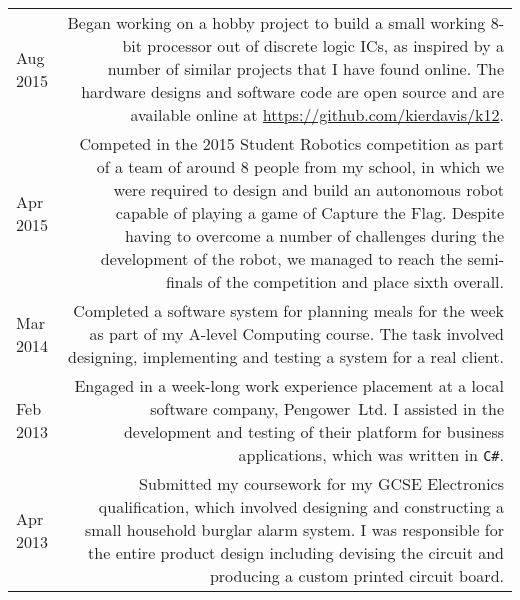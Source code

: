 
\vspace{-1.2em}

\begin{longtable}{L!{\sep}R}
    Aug 2015 &
    Began working on a hobby project to build a small working 8-bit processor out of discrete logic ICs, as inspired by a number of similar projects that I have found online. The hardware designs and software code are open source and are available online at \url{https://github.com/kierdavis/k12}.
    \vspace{1.2em} \\

    Apr 2015 &
    Competed in the 2015 Student Robotics competition as part of a team of around 8 people from my school, in which we were required to design and build an autonomous robot capable of playing a game of Capture the Flag. Despite having to overcome a number of challenges during the development of the robot, we managed to reach the semi-finals of the competition and place sixth overall.
    \vspace{1.2em} \\

    Mar 2014 &
    Completed a software system for planning meals for the week as part of my A-level Computing course. The task involved designing, implementing and testing a system for a real client.
    \vspace{1.2em} \\


    Feb 2013 &
    Engaged in a week-long work experience placement at a local software company, \mbox{Pengower Ltd}. I assisted in the development and testing of their platform for business applications, which was written in \texttt{C\#}.
    \vspace{1.2em} \\

    Apr 2013 &
    Submitted my coursework for my GCSE Electronics qualification, which involved designing and constructing a small household burglar alarm system. I was responsible for the entire product design including devising the circuit and producing a custom printed circuit board.
    \vspace{1.2em} \\


\end{longtable}

